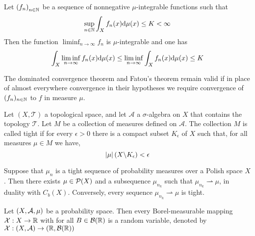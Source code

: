 \begin{corollary}
	Let $\left( f_n \right)_{n\in \mathbb{N}}$ be a sequence of nonnegative $\mu$-integrable functions such that 
	\begin{equation*}
		\sup_{n\in \mathbb{N}}\int_{X} f_n(x)\mathrm{d}\mu(x) \leq K < \infty
	\end{equation*}
	Then the function $\liminf_{n\rightarrow \infty} f_n$ is $\mu$-integrable and one has 
	\begin{equation}
		\int_X \liminf_{n\rightarrow\infty}f_n(x)\mathrm{d}\mu(x)\leq \liminf_{n\rightarrow \infty} \int_X f_n(x)\mathrm{d}\mu(x) \leq K
	\end{equation}
\end{corollary}

\begin{corollary}
The dominated convergence theorem and Fatou’s theorem remain valid if in place of almost everywhere convergence in their hypotheses we require convergence of $(f_n)_{n\in \mathbb{N}}$ to $f$ in measure $\mu$.
\end{corollary}



\begin{definition}[Tightness] Let $(X, \mathcal T)$ a topological space, and let $\mathcal A$ a $\sigma$-algebra on $X$ that contains the topology $\mathcal{T}$. Let $M$ be a collection of measures defined on $\mathcal{A}$. The collection $M$ is called tight  if for every $\epsilon>0$ there is a compact subset $K_\epsilon$ of $X$ such that, for all measures $\mu\in M$ we have,
	\begin{equation*}
	\left| \mu \right|\left( X \backslash K_\epsilon \right) < \epsilon
	\end{equation*} 
\end{definition}


\begin{theorem}[Prokhorov]
	Suppose that $\mu_n $ is a tight sequence of probability measures over a Polish space $X$. Then there exists $\mu\in\mathcal{P}(X)$ and a subsequence $\mu_{n_k}$ such that $\mu_{n_k}\rightharpoonup \mu $, in duality with $C_b(X)$. Conversely, every sequence $\mu_{n_k}\rightharpoonup \mu$ is tight.
\end{theorem}

\begin{definition}
	Let $\left( X, \mathcal A, \mu \right)$ be a probability space. Then every Borel-measurable mapping $\mathcal{X}: X\rightarrow \mathbb{R}$ with for all $B\in \mathcal B(\mathbb{R}) $ is a random variable, denoted by $\mathcal{X}: \left( X, \mathcal A \right)\rightarrow \left( \mathbb{R}, \mathcal B (\mathbb{R}) \right) $
\end{definition}

